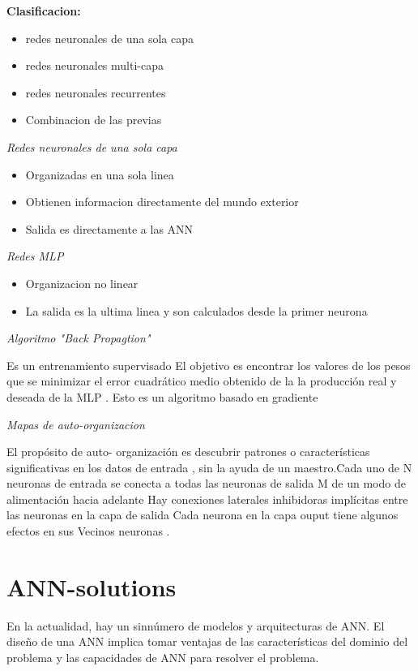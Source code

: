 \documentclass[11pt]{article}
\begin{document}
\textbf{Clasificacion: }

\begin{itemize}
\item redes neuronales de una sola capa
\item redes neuronales multi-capa
\item redes neuronales recurrentes
\item Combinacion de las previas
\end{itemize}


\emph{Redes neuronales de una sola capa}

\begin{itemize}
\item Organizadas en una sola linea
\item Obtienen informacion directamente del mundo exterior
\item Salida es directamente a las ANN
\end{itemize}

\emph{Redes MLP}

\begin{itemize}
\item Organizacion no linear
\item La salida es la ultima linea y son calculados desde la primer neurona
\end{itemize}

\emph{Algoritmo "Back Propagtion"}

Es un entrenamiento supervisado
El objetivo es encontrar los valores de los pesos que se
minimizar el error cuadrático medio obtenido de la
la producción real y deseada de la MLP . Esto es un
algoritmo basado en gradiente

\emph{Mapas de auto-organizacion}

El propósito de auto- organización es descubrir patrones o características significativas en los datos de entrada , sin la ayuda de un maestro.Cada uno de N neuronas de entrada se conecta a todas las neuronas de salida M de un modo de alimentación hacia adelante
Hay conexiones laterales inhibidoras implícitas entre las neuronas en la capa de salida
Cada neurona en la capa ouput tiene algunos efectos en sus Vecinos neuronas .
\newpage

\section{ANN-solutions}

En la actualidad, hay un sinnúmero de modelos y arquitecturas de ANN. El diseño de una ANN implica tomar ventajas de las características del dominio del problema y las capacidades de ANN para resolver el problema.
\\
\\
\end{document}
